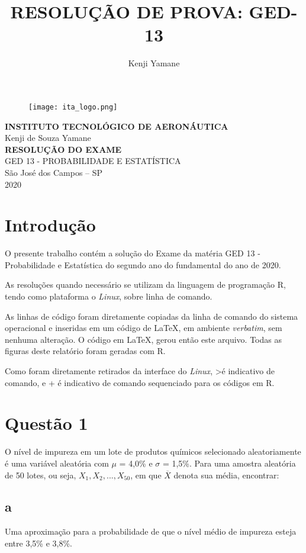 \documentclass{article}[twocolumn]
\title{RESOLUÇÃO DE PROVA: GED-13}
\author{Kenji Yamane}
\begin{document}
	\begin{figure}[H]
		\centering
		\texttt{[image: ita\_logo.png]}
	\end{figure}
	\begin{center}
		\textbf{\normalsize{INSTITUTO TECNOLÓGICO DE AERONÁUTICA}}\\
		\vspace{2.5cm}
		\large{Kenji de Souza Yamane}\\
		\vspace{4.7cm}
		\textbf{RESOLUÇÃO DO EXAME}\\
		\large{GED 13 - PROBABILIDADE E ESTATÍSTICA}\\
		\vspace{4.7cm}
		\small{São José dos Campos – SP\\2020}
	\end{center}
	\newpage
	\tableofcontents
	\newpage
	\section{Introdução}
	O presente trabalho contém a solução do Exame da matéria GED 13 - Probabilidade e
	Estatística do segundo ano do fundamental do ano de 2020.

	As resoluções quando necess\'ario se utilizam da linguagem de programação R, tendo
	como plataforma o \textit{Linux}, sobre linha de comando.

	As linhas de código foram diretamente copiadas da linha de comando do sistema operacional
	e inseridas em um código de \LaTeX, em ambiente \textit{verbatim}, sem nenhuma alteração.
	O código em \LaTeX, gerou então este arquivo. Todas as figuras deste relat\'orio foram
	geradas com R.
	
	Como foram diretamente retirados da interface do \textit{Linux}, \textgreater é indicativo
	de comando, e + é indicativo de comando sequenciado para os c\'odigos em R.
	\newpage
	\section{Quest\~ao 1}
	O nível de impureza em um lote de produtos químicos selecionado aleatoriamente é uma
	variável aleatória com $\mu$ = 4,0\% e $\sigma$ = 1,5\%. Para uma amostra aleatória de
	50 lotes, ou seja, $X_1, X_2, ..., X_{50}$, em que $\overline{X}$ denota sua média, encontrar:
	\subsection{a}
	Uma aproximação para a probabilidade de que o nível médio de impureza esteja entre
	3,5\% e 3,8\%.
\end{document}

